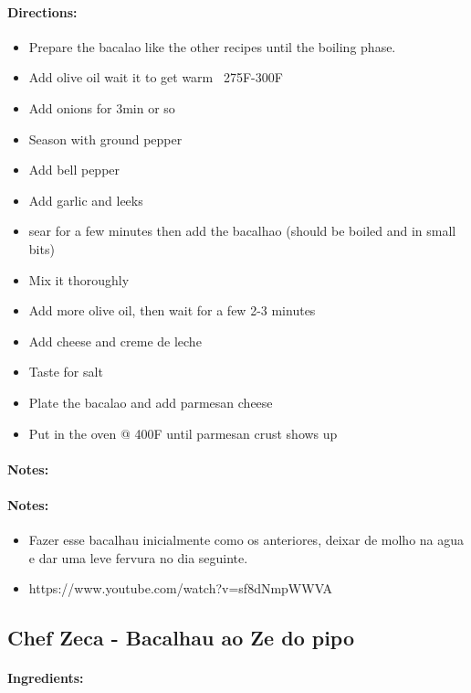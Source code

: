 \documentclass{article}
\begin{document}
\paragraph{Directions:}
\begin{itemize}
	\item Prepare the bacalao like the other recipes until the boiling phase.
	\item Add olive oil wait it to get warm ~275F-300F
	\item Add onions for 3min or so
	\item Season with ground pepper
	\item Add bell pepper
	\item Add garlic and leeks
	\item sear for a few minutes then add the bacalhao (should be boiled and in small bits)
	\item Mix it thoroughly
	\item Add more olive oil, then wait for a few 2-3 minutes
	\item Add cheese and creme de leche
	\item Taste for salt
	\item Plate the bacalao and add parmesan cheese
	\item Put in the oven @ 400F until parmesan crust shows up
\end{itemize}

\paragraph{Notes:}

\paragraph{Notes:}
\begin{itemize}
	\item Fazer esse bacalhau inicialmente como os anteriores, deixar de molho na agua e dar uma leve fervura no dia seguinte.
	\item https://www.youtube.com/watch?v=sf8dNmpWWVA
\end{itemize}

\subsection{Chef Zeca - Bacalhau ao Ze do pipo}

\paragraph{Ingredients:}
\end{document}
